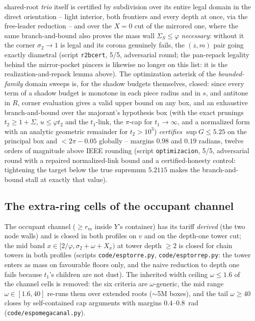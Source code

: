 \documentclass[11pt]{article}
\theoremstyle{definition}
\begin{document}
shared-root \emph{trio} itself is certified by subdivision over its entire legal domain in the direct
orientation -- light interior, both frontiers and every depth at
once, via the free-leader reduction -- and over the $X=0$ cut of
the mirrored one, where the same branch-and-bound also proves the
mass wall $\Sigma_S\le\varphi$ \emph{necessary}: without it the
corner $\sigma_2\to1$ is legal and its corona genuinely fails, the
$(z,m)$ pair going exactly diametral (script \texttt{r2bcert}, 5/5,
adversarial round; the pan-repack legality behind the
mirror-pocket pincers is likewise no longer on this list: it is the
realization-and-repack lemma above). The optimization asterisk of
the \emph{bounded-family} domain sweeps is, for the shadow budgets
themselves, closed: since every term of a
shadow budget is monotone in each piece radius and in $s$, and
antitone in $R$, corner evaluation gives a valid upper bound on any
box, and an exhaustive branch-and-bound over the majorant's
hypothesis box (with the exact prunings $t_2\ge1+\Sigma$,
$u\le\varphi t_2$ and the $t_1$-link, the $\pi$-cap for
$t_1\to\infty$, and a normalized form with an analytic geometric
remainder for $t_2>10^3$) \emph{certifies}
$\sup G\le5.25$ on the principal box and $<2\pi-0.05$ globally --
margins $0.98$ and $0.19$ radians, twelve orders of magnitude above
IEEE rounding (script \texttt{optimizacion}, 5/5, adversarial round
with a repaired normalized-link bound and a certified-honesty
control: tightening the target below the true supremum $5.2115$
makes the branch-and-bound stall at exactly that value).

\subsection*{The extra-ring cells of the occupant channel}

The occupant channel ($\ge r_m$ inside $Y$'s container) has its
tariff \emph{derived} (the two node walls) and is closed in both
profiles on $v$ and on the depth-one tower cut; the mid band
$x\in[2/\varphi,\sigma_2+\omega+X_x)$ at tower depth $\ge2$ is closed
for chain towers in both profiles (scripts
\texttt{code/esptorre.py}, \texttt{code/esptorrep.py}: the tower
enters as mass on favourable floors only, and the naive reduction
to depth one fails because $t_1$'s children are not dust). The
inherited width ceiling $\omega\le1.6$ of the channel cells is
removed: the six criteria are $\omega$-generic, the mid range
$\omega\in[1.6,40]$ re-runs them over extended roots ($\sim$5M
boxes), and the tail $\omega\ge40$ closes by self-contained cap
arguments with margins $0.4$--$0.8$~rad
(\texttt{code/espomegacanal.py}).
\end{document}
